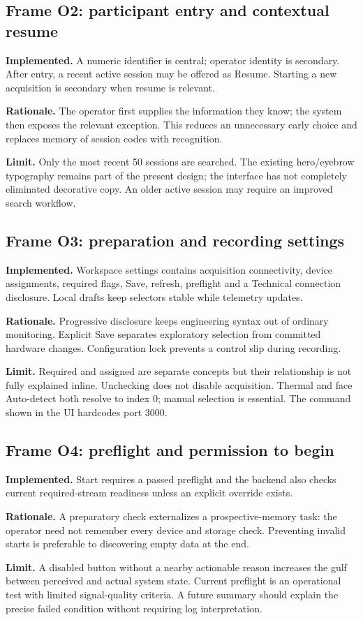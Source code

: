 \documentclass[11pt,a4paper]{article}
\begin{document}
\subsection{Frame O2: participant entry and contextual resume}
\textbf{Implemented.} A numeric identifier is central; operator identity is secondary. After entry, a recent active session may be offered as Resume. Starting a new acquisition is secondary when resume is relevant.\par
\textbf{Rationale.} The operator first supplies the information they know; the system then exposes the relevant exception. This reduces an unnecessary early choice and replaces memory of session codes with recognition.\par
\textbf{Limit.} Only the most recent 50 sessions are searched. The existing hero/eyebrow typography remains part of the present design; the interface has not completely eliminated decorative copy. An older active session may require an improved search workflow.

\subsection{Frame O3: preparation and recording settings}
\textbf{Implemented.} Workspace settings contains acquisition connectivity, device assignments, required flags, Save, refresh, preflight and a Technical connection disclosure. Local drafts keep selectors stable while telemetry updates.\par
\textbf{Rationale.} Progressive disclosure keeps engineering syntax out of ordinary monitoring. Explicit Save separates exploratory selection from committed hardware changes. Configuration lock prevents a control slip during recording.\par
\textbf{Limit.} Required and assigned are separate concepts but their relationship is not fully explained inline. Unchecking does not disable acquisition. Thermal and face Auto-detect both resolve to index 0; manual selection is essential. The command shown in the UI hardcodes port 3000.

\subsection{Frame O4: preflight and permission to begin}
\textbf{Implemented.} Start requires a passed preflight and the backend also checks current required-stream readiness unless an explicit override exists.\par
\textbf{Rationale.} A preparatory check externalizes a prospective-memory task: the operator need not remember every device and storage check. Preventing invalid starts is preferable to discovering empty data at the end.\par
\textbf{Limit.} A disabled button without a nearby actionable reason increases the gulf between perceived and actual system state. Current preflight is an operational test with limited signal-quality criteria. A future summary should explain the precise failed condition without requiring log interpretation.
\end{document}
